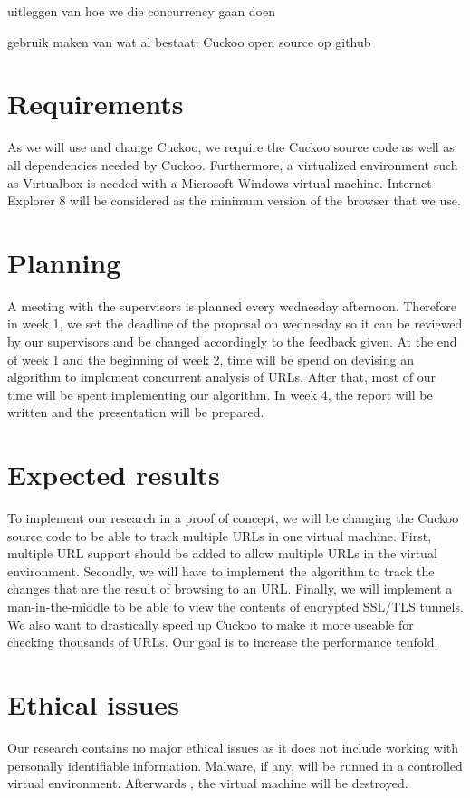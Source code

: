 \documentclass{scrartcl}
\begin{document}
uitleggen van hoe we die concurrency gaan doen

gebruik maken van wat al bestaat: Cuckoo
open source op github


\section{Requirements}

As we will use and change Cuckoo, we require the Cuckoo source code as well as all dependencies needed by Cuckoo. Furthermore, a virtualized environment such as Virtualbox is needed with a Microsoft Windows virtual machine. Internet Explorer 8 will be considered as the minimum version of the browser that we use.

\section{Planning}

A meeting with the supervisors is planned every wednesday afternoon. Therefore in week 1, we set the deadline of the proposal on wednesday so it can be reviewed by our supervisors and be changed accordingly to the feedback given. At the end of week 1 and the beginning of week 2, time will be spend on devising an algorithm to implement concurrent analysis of URLs. After that, most of our time will be spent implementing our algorithm. In week 4, the report will be written and the presentation will be prepared.

\section{Expected results}

To implement our research in a proof of concept, we will be changing the Cuckoo source code to be able to track multiple URLs in one virtual machine. First, multiple URL support should be added to allow multiple URLs in the virtual environment. Secondly, we will have to implement the algorithm to track the changes that are the result of browsing to an URL. Finally, we will implement a man-in-the-middle to be able to view the contents of encrypted SSL/TLS tunnels.\\

We also want to drastically speed up Cuckoo to make it more useable for checking thousands of URLs. Our goal is to increase the performance tenfold.

\section{Ethical issues}

Our research contains no major ethical issues as it does not include working with personally identifiable information. Malware, if any, will be runned in a controlled virtual environment. Afterwards , the virtual machine will be destroyed.



\end{document}
